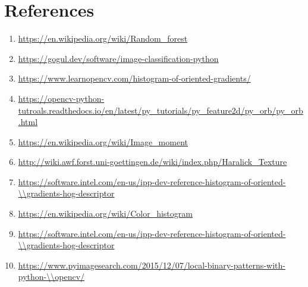 \documentclass[12pt]{article}
\begin{document}
\newpage

\section{References}

\begin{enumerate}
\item \url{https://en.wikipedia.org/wiki/Random\_forest}
\item \url{https://gogul.dev/software/image-classification-python}
\item \url{https://www.learnopencv.com/histogram-of-oriented-gradients/}
\item \url{https://opencv-python-tutroals.readthedocs.io/en/latest/py_tutorials/py_feature2d/py_orb/py_orb.html}
\item \url{https://en.wikipedia.org/wiki/Image_moment}
\item \url{http://wiki.awf.forst.uni-goettingen.de/wiki/index.php/Haralick_Texture}
\item \url{https://software.intel.com/en-us/ipp-dev-reference-histogram-of-oriented-\\gradients-hog-descriptor}
\item \url{https://en.wikipedia.org/wiki/Color_histogram}
\item \url{https://software.intel.com/en-us/ipp-dev-reference-histogram-of-oriented-\\gradients-hog-descriptor}
\item \url{https://www.pyimagesearch.com/2015/12/07/local-binary-patterns-with-python-\\opencv/}

\end{enumerate}
\end{document}
